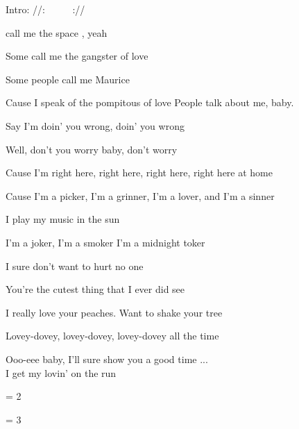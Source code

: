 
Intro: //: ~  ~  ~  ://

\zs
{}  call me the space , yeah~ ~ 

Some call me the gangster of love

Some people call me Maurice

Cause I speak of the pompitous of love
\ks
\zs
People talk about me, baby. 

Say I'm doin' you wrong, doin' you wrong

Well, don't you worry baby, don't worry

Cause I'm right here, right here, right here, right here at home
\ks
\zr

Cause I'm a picker, I'm a grinner, I'm a lover, and I'm a sinner

I play my music in the sun
\bigskip

I'm a joker, I'm a smoker I'm a midnight toker

I sure don't want to hurt no one
\kr

\zs
You're the cutest thing that I ever did see

I really love your peaches. Want to shake your tree

Lovey-dovey, lovey-dovey, lovey-dovey all the time

Ooo-eee baby, I'll sure show you a good time
\ks
\zr
...\\
I get my lovin' on the run
\kr

\zr\kr

\zs
= 2
\ks

\zs
= 3
\ks
\kp

